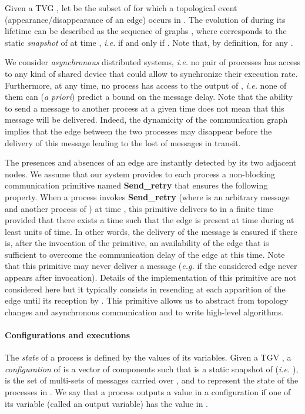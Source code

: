 \documentclass{article}
\begin{document}
Given a TVG , let  be the subset of  for which a topological event (appearance/disappearance of an edge) occurs in . The evolution of  during its lifetime  can be described as the sequence of graphs , where  corresponds to the static {\em snapshot} of  at time , \emph{i.e.}  if and only if . Note that, by definition,  for any . 

We consider {\em asynchronous} distributed systems, \emph{i.e.} no pair of processes has access to any kind of shared device that could allow to synchronize their execution rate.  Furthermore, at any time, no process has access to the output of , \emph{i.e.} none of them can ({\em a priori}) predict a bound on the message delay. Note that the ability to send a message to another process at a given time does not mean that this message will be delivered. Indeed, the dynamicity of the communication graph implies that the edge between the two processes may disappear before the delivery of this message leading to the lost of messages in transit. 

The presences and absences of an edge are instantly detected by its two adjacent nodes. We assume that our system provides to each process a non-blocking communication primitive named \textbf{Send\_retry} that ensures the following property. When a process  invokes \textbf{Send\_retry} (where  is an arbitrary message and  another process of ) at time , this primitive delivers  to  in a finite time provided that there exists a time  such that the edge  is present at time  during at least  units of time. In other words, the delivery of the message is ensured if there is, after the invocation of the primitive, an availability of the edge that is sufficient to overcome the communication delay of the edge at this time. Note that this primitive may never deliver a message (\emph{e.g.} if the considered edge never appears after invocation). Details of the implementation of this primitive are not considered here but it typically consists in resending  at each apparition of the edge  until its reception by . This primitive allows us to abstract from topology changes and asynchronous communication and to write high-level algorithms.

\paragraph{Configurations and executions} The \emph{state} of a process is defined by the values of its variables. Given a TGV , a \emph{configuration} of  is a vector of  components  such that  is a static snapshot of  (\emph{i.e.} ),  is the set of multi-sets of messages carried over , and  to  represent the state of the  processes in . We say that a process  outputs a value  in a configuration  if one of its variable (called an output variable) has the value  in .
\end{document}
